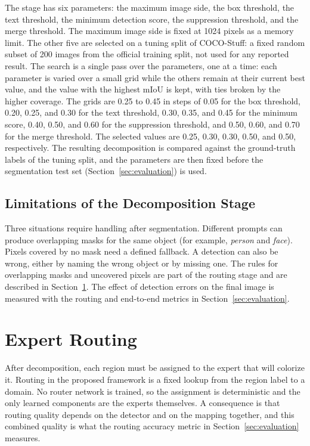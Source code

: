 \documentclass{FastFyp}
\begin{document}
The stage has six parameters: the maximum image side, the box threshold, the text threshold, the minimum detection score, the suppression threshold, and the merge threshold. The maximum image side is fixed at 1024 pixels as a memory limit. The other five are selected on a tuning split of COCO-Stuff: a fixed random subset of 200 images from the official training split, not used for any reported result. The search is a single pass over the parameters, one at a time: each parameter is varied over a small grid while the others remain at their current best value, and the value with the highest mIoU is kept, with ties broken by the higher coverage. The grids are 0.25 to 0.45 in steps of 0.05 for the box threshold, 0.20, 0.25, and 0.30 for the text threshold, 0.30, 0.35, and 0.45 for the minimum score, 0.40, 0.50, and 0.60 for the suppression threshold, and 0.50, 0.60, and 0.70 for the merge threshold. The selected values are 0.25, 0.30, 0.30, 0.50, and 0.50, respectively. The resulting decomposition is compared against the ground-truth labels of the tuning split, and the parameters are then fixed before the segmentation test set (Section~\ref{sec:evaluation}) is used.

\subsection{Limitations of the Decomposition Stage}

Three situations require handling after segmentation. Different prompts can produce overlapping masks for the same object (for example, \textit{person} and \textit{face}). Pixels covered by no mask need a defined fallback. A detection can also be wrong, either by naming the wrong object or by missing one. The rules for overlapping masks and uncovered pixels are part of the routing stage and are described in Section~\ref{sec:routing}. The effect of detection errors on the final image is measured with the routing and end-to-end metrics in Section~\ref{sec:evaluation}.

\section{Expert Routing}
\label{sec:routing}

After decomposition, each region must be assigned to the expert that will colorize it. Routing in the proposed framework is a fixed lookup from the region label to a domain. No router network is trained, so the assignment is deterministic and the only learned components are the experts themselves. A consequence is that routing quality depends on the detector and on the mapping together, and this combined quality is what the routing accuracy metric in Section~\ref{sec:evaluation} measures.
\end{document}
